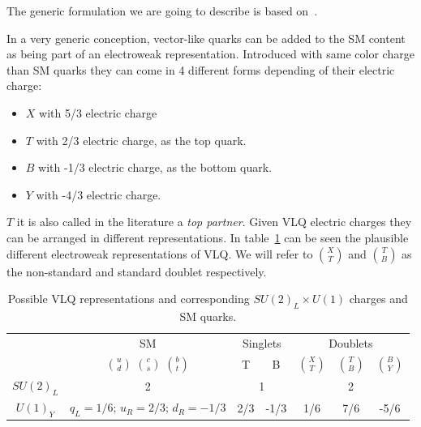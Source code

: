 The generic formulation we are going to describe is based on~\cite{Buchkremer:2013bha, Cacciapaglia:2011fx}.

In a very generic conception, vector-like quarks can be added to the SM content as being part of an electroweak representation. Introduced with same color charge than SM quarks they can come in 4 different forms depending of their electric charge:
\begin{itemize}
\item $X$ with 5/3 electric charge
\item $T$ with 2/3 electric charge, as the top quark.
\item $B$ with -1/3 electric charge, as the bottom quark.
\item $Y$ with -4/3 electric charge.
\end{itemize}

$T$ it is also called in the literature a \textit{top partner}. Given VLQ electric charges they can be arranged in different representations. In table~\ref{tab:VLQRepre} can be seen the plausible different electroweak representations of VLQ. We will refer to $\binom{X}{T}$ and $\binom{T}{B}$ as the non-standard and standard doublet respectively.  

\begin{table}[htbH]
\label{tab:VLQRepre}
\begin{center}
\begin{tabular}{|c|c|c|c|c|c|c|}
\hline 
 & SM & \multicolumn{2}{c|}{Singlets} & \multicolumn{3}{c|}{Doublets} \\
 & $\binom{u}{d}$ $\binom{c}{s}$ $\binom{b}{t}$ & T & B & $\binom{X}{T}$ & $\binom{T}{B}$ & $\binom{B}{Y}$ \\ 
\hline
$SU(2)_{L}$ & 2 & \multicolumn{2}{c|}{1} & \multicolumn{3}{c|}{2} \\ \hline
$U(1)_{Y}$ & $q_{L}=1/6$; $u_{R}=2/3$; $d_{R}=-1/3$ & 2/3 & -1/3 & 1/6 & 7/6 & -5/6 \\
\hline
\end{tabular}
\caption{Possible VLQ representations and corresponding $SU(2)_{L}\times U(1)$ charges and SM quarks.}
\end{center}
\end{table}

